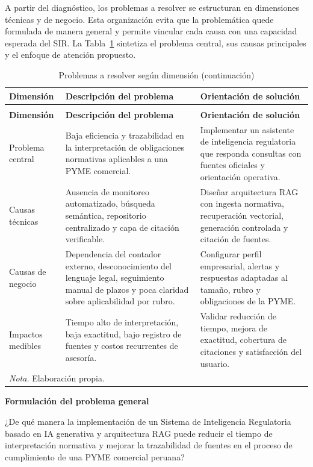 \documentclass[12pt,a4paper,oneside]{report}
\begin{document}
A partir del diagnóstico, los problemas a resolver se estructuran en dimensiones técnicas y de negocio. Esta organización evita que la problemática quede formulada de manera general y permite vincular cada causa con una capacidad esperada del SIR. La Tabla~\ref{tab:problemas-resolver} sintetiza el problema central, sus causas principales y el enfoque de atención propuesto.

\begin{longtable}{@{}p{}p{}p{}@{}}
\caption{Problemas a resolver según dimensión}\label{tab:problemas-resolver}\\
\toprule
\textbf{Dimensión} & \textbf{Descripción del problema} & \textbf{Orientación de solución} \\
\midrule
\endfirsthead
\caption[]{Problemas a resolver según dimensión (continuación)}\\
\toprule
\textbf{Dimensión} & \textbf{Descripción del problema} & \textbf{Orientación de solución} \\
\midrule
\endhead
Problema central & Baja eficiencia y trazabilidad en la interpretación de obligaciones normativas aplicables a una PYME comercial. & Implementar un asistente de inteligencia regulatoria que responda consultas con fuentes oficiales y orientación operativa. \\
Causas técnicas & Ausencia de monitoreo automatizado, búsqueda semántica, repositorio centralizado y capa de citación verificable. & Diseñar arquitectura RAG con ingesta normativa, recuperación vectorial, generación controlada y citación de fuentes. \\
Causas de negocio & Dependencia del contador externo, desconocimiento del lenguaje legal, seguimiento manual de plazos y poca claridad sobre aplicabilidad por rubro. & Configurar perfil empresarial, alertas y respuestas adaptadas al tamaño, rubro y obligaciones de la PYME. \\
Impactos medibles & Tiempo alto de interpretación, baja exactitud, bajo registro de fuentes y costos recurrentes de asesoría. & Validar reducción de tiempo, mejora de exactitud, cobertura de citaciones y satisfacción del usuario. \\
\bottomrule
\multicolumn{3}{p{0.94\textwidth}}{\normalsize \textit{Nota.} Elaboración propia.}\\
\end{longtable}

\textbf{Formulación del problema general}

¿De qué manera la implementación de un Sistema de Inteligencia Regulatoria basado en IA generativa y arquitectura RAG puede reducir el tiempo de interpretación normativa y mejorar la trazabilidad de fuentes en el proceso de cumplimiento de una PYME comercial peruana?
\end{document}
